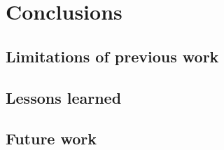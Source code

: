 

    \chapter{Conclusions}

            
    \section{Limitations of previous work}

    \section{Lessons learned}

    \section{Future work} 

 
